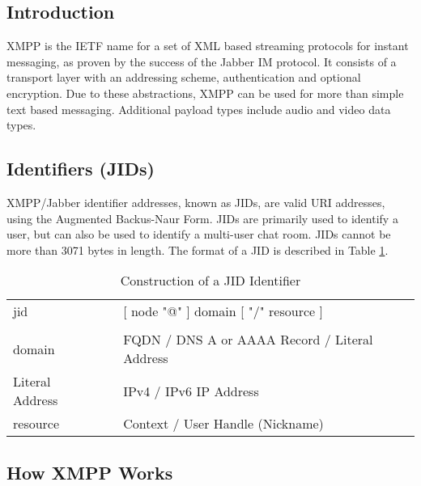 
\subsection{Introduction}

XMPP is the IETF name for a set of XML based streaming protocols for
instant messaging, as proven by the success of the Jabber IM protocol.
It consists of a transport layer with an addressing scheme, 
authentication and optional encryption. Due to these abstractions, XMPP 
can be used for more than simple text based messaging. Additional 
payload types include audio and video data types.

\subsection{Identifiers (JIDs)}

XMPP/Jabber identifier addresses, known as JIDs, are valid URI 
addresses, using the Augmented Backus-Naur Form. JIDs are primarily used 
to identify a user, but can also be used to identify a multi-user 
chat room. JIDs cannot be more than 3071 bytes in length. The format of a
JID is described in Table \ref{tab:jid}.

\begin{table}[p]

\label{tab:jid}

\begin{center}

\begin{tabular}{lll}
jid		&		&	[ node "@" ] domain [ "/" resource ]				\\
			&		&																	\\
domain	&		&	FQDN / DNS A or AAAA Record / Literal Address	\\
Literal Address	&		&	IPv4 / IPv6 IP Address						\\
resource &		&	Context / User Handle (Nickname)						\\
\end{tabular}

\end{center}

\caption{Construction of a JID Identifier}

\end{table}

\subsection{How XMPP Works}

